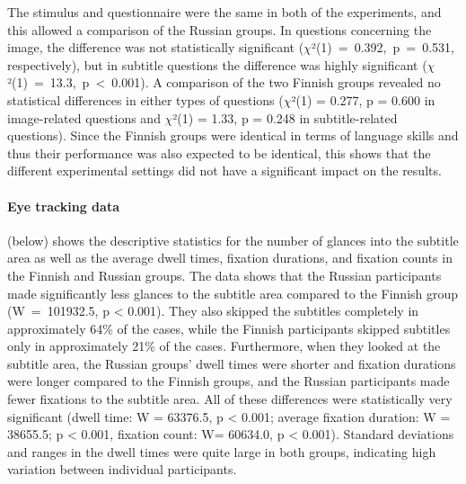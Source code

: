 \documentclass[output=paper]{langsci/langscibook}
\begin{document}
The stimulus and questionnaire were the same in both of the experiments, and this allowed a comparison of the Russian groups. In questions concerning the image, the difference was not statistically significant ($\chi $²(1)~=~0.392,~p~=~0.531, respectively), but in subtitle questions the difference was highly significant ($\chi $²(1)~=~13.3,~p~{\textless}~0.001). A comparison of the two Finnish groups revealed no statistical differences in either types of questions ($\chi $²(1) = 0.277, p = 0.600 in image-related questions and $\chi $²(1) = 1.33, p = 0.248 in subtitle-related questions). Since the Finnish groups were identical in terms of language skills and thus their performance was also expected to be identical, this shows that the different experimental settings did not have a significant impact on the results.

\paragraph{Eye tracking data}

 (below) shows the descriptive statistics for the number of glances into the subtitle area as well as the average dwell times, fixation durations, and fixation counts in the Finnish and Russian groups. The data shows that the Russian participants made significantly less glances to the subtitle area compared to the Finnish group (W~=~101932.5, p {\textless} 0.001). They also skipped the subtitles completely in approximately 64\% of the cases, while the Finnish participants skipped subtitles only in approximately 21\% of the cases. Furthermore, when they looked at the subtitle area, the Russian groups' dwell times were shorter and fixation durations were longer compared to the Finnish groups, and the Russian participants made fewer fixations to the subtitle area. All of these differences were statistically very significant (dwell time: W = 63376.5, p {\textless} 0.001; average fixation duration: W = 38655.5; p {\textless} 0.001, fixation count: W= 60634.0, p {\textless} 0.001). Standard deviations and ranges in the dwell times were quite large in both groups, indicating high variation between individual participants.
\end{document}
